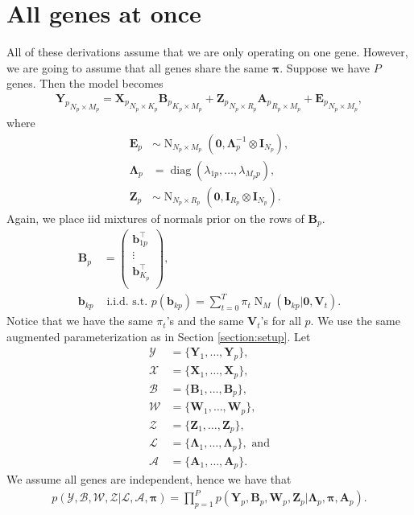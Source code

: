 \documentclass[11pt,authoryear]{article}
\DeclareMathOperator*{\diag}{diag}
\DeclareMathOperator*{\N}{N}
\newcommand{\bs}[1]{\boldsymbol{#1}}
\begin{document}
\section{All genes at once}
All of these derivations assume that we are only operating on one gene. However, we are going to assume that all genes share the same $\bs{\pi}$. Suppose we have $P$ genes. Then the model becomes
\begin{align}
{\bs{Y}_p}_{N_p\times M_p} = {\bs{X}_p}_{N_p \times K_p}{\bs{B}_p}_{K_p \times M_p} + {\bs{Z}_p}_{N_p \times R_p}{\bs{A}_p}_{R_p \times M_p} + {\bs{E}_p}_{N_p \times M_p},
\end{align}
where
\begin{align}
\bs{E}_p &\sim \N_{N_p \times M_p}(\bs{0}, \bs{\Lambda}_p^{-1} \otimes \bs{I}_{N_p}),\\
\bs{\Lambda}_p &= \diag(\lambda_{1p},\ldots,\lambda_{M_pp}),\\
\bs{Z}_p &\sim \N_{N_p\times R_p}(\bs{0}, \bs{I}_{R_p} \otimes \bs{I}_{N_p}).
\end{align}
Again, we place iid mixtures of normals prior on the rows of $\bs{B}_p$.
\begin{align}
\bs{B}_p &=
\left(
\begin{array}{c}
\bs{b}_{1p}^\intercal\\
\vdots\\
\bs{b}_{K_p}^\intercal\\
\end{array}
\right),\\
\bs{b}_{kp} &\text{ i.i.d. s.t. } p(\bs{b}_{kp}) = \sum_{t = 0}^T\pi_t\N_M(\bs{b}_{kp} | \bs{0}, \bs{V}_t).
\end{align}
Notice that we have the same $\pi_t$'s and the same $\bs{V}_t$'s for all $p$. We use the same augmented parameterization as in Section \ref{section:setup}. Let
\begin{align}
\mathcal{Y} &= \{\bs{Y}_1,\ldots,\bs{Y}_p\},\\
\mathcal{X} &= \{\bs{X}_1,\ldots,\bs{X}_p\},\\
\mathcal{B} &= \{\bs{B}_1,\ldots,\bs{B}_p\},\\
\mathcal{W} &= \{\bs{W}_1,\ldots,\bs{W}_p\},\\
\mathcal{Z} &= \{\bs{Z}_1,\ldots,\bs{Z}_p\},\\
\mathscr{L} &= \{\bs{\Lambda}_1,\ldots,\bs{\Lambda}_p\}, \text{ and}\\
\mathcal{A} &= \{\bs{A}_1,\ldots,\bs{A}_p\}.
\end{align}
We assume all genes are independent, hence we have that
\begin{align}
p(\mathcal{Y}, \mathcal{B}, \mathcal{W}, \mathcal{Z} | \mathscr{L}, \mathcal{A}, \bs{\pi}) =  \prod_{p = 1}^P p(\bs{Y}_p,\bs{B}_p,\bs{W}_p,\bs{Z}_p|\bs{\Lambda}_p,\bs{\pi},\bs{A}_p).
\end{align}
\end{document}
